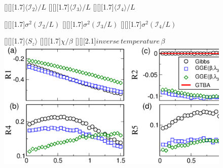 \documentclass[12pt]{article}
\begin{document}

\begin{figure}
[][][1.7]{$\langle{\mathcal I}_2\rangle/L$}
[][][1.7]{$\langle{\mathcal I}_3\rangle/L$}
[][][1.7]{$\langle{\mathcal I}_4\rangle/L$}

[][][1.7]{$\sigma^2({\mathcal I}_2/L)$}
[][][1.7]{$\sigma^2({\mathcal I}_3/L)$}
[][][1.7]{$\sigma^2({\mathcal I}_4/L)$}

[][][1.7]{$\langle S_z\rangle$}
[][][1.7]{$\chi/\beta$}
[][][2.1]{$inverse\, temperature\, \beta$}
\includegraphics{fig1.eps}
\end{figure}
\end{document}
